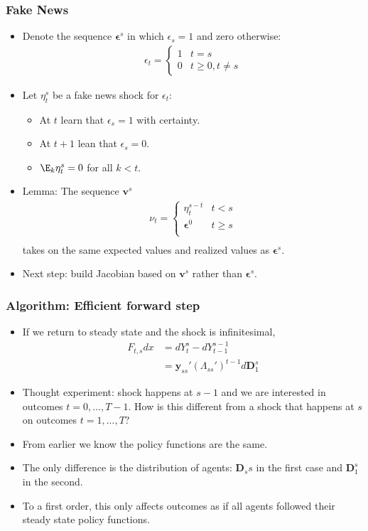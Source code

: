 \documentclass[english,xcolor=svgnames]{beamer}
\begin{document}
\begin{frame}
    \frametitle{Fake News}
    \begin{itemize}
    	\item Denote the sequence $\bm{\epsilon}^s$ in which $\epsilon_s=1$ and zero otherwise:
        \begin{align*}
    		\epsilon_t = \begin{cases}
    			1 & t=s \\
    			0 & t\ge0, t\neq s
    		\end{cases}
    	\end{align*}
        \item Let $\eta_t^s$ be a fake news shock for $\epsilon_t$:
        \begin{itemize}
        	\item At $t$ learn that $\epsilon_{s}=1$ with certainty.
        	\item At $t+1$ lean that $\epsilon_{s}=0$.
        	\item $\E_{k}\eta_t^s=0$ for all $k<t$.
        \end{itemize}
        \item Lemma: The sequence $\bm{v}^s$
        \begin{align*}
    		\nu_t = \begin{cases}
    			\eta_t^{s-t} & t<s \\
    			\bm{\epsilon}^0 & t \ge s \\
    		\end{cases}\\
    	\end{align*}
        takes on the same expected values and realized values as $\bm{\epsilon}^s$.
        \item Next step: build Jacobian based on $\bm{v}^s$ rather than $\bm{\epsilon}^s$.
	\end{itemize}
\end{frame}

\begin{frame}
    \frametitle{Algorithm: Efficient forward step}
    \begin{itemize}
    	\item If we return to steady state and the shock is infinitesimal,
    	\begin{align*}
            F_{t,s}dx & = dY_{t}^{s} - dY_{t-1}^{s-1} \\
                &= \bm{y}_{ss}' (\Lambda_{ss}')^{t-1}d\bm{D}_1^s 
        \end{align*}
        \item Thought experiment: shock happens at $s-1$ and we are interested in outcomes $t=0,...,T-1$. How is this different from a shock that happens at $s$ on outcomes $t=1,...,T$?
        \item From earlier we know the policy functions are the same.
        \item The only difference is the distribution of agents: $\bm{D}_ss$ in the first case and $\bm{D}_1^s$ in the second.
        \item To a first order, this only affects outcomes as if all agents followed their steady state policy functions.
	\end{itemize}
\end{frame}
\end{document}

